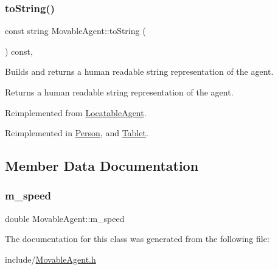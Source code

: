 \subsubsection{\texorpdfstring{to\+String()}{toString()}}
{\footnotesize\ttfamily const string Movable\+Agent\+::to\+String (\begin{DoxyParamCaption}{ }\end{DoxyParamCaption}) const\hspace{0.3cm}{\ttfamily [override]}, {\ttfamily [virtual]}}

Builds and returns a human readable string representation of the agent. \begin{DoxyReturn}{Returns}
a human readable string representation of the agent. 
\end{DoxyReturn}


Reimplemented from \hyperlink{class_locatable_agent_a88674f4c8ab9b1b2f3986b226bf4244f}{Locatable\+Agent}.



Reimplemented in \hyperlink{class_person_a68872538da519d0a04297f43376db27c}{Person}, and \hyperlink{class_tablet_a3fae01e7d526699476221c6a686a4fba}{Tablet}.



\subsection{Member Data Documentation}
\mbox{\label{class_movable_agent_ac725b42e7b968740a59c3e1033d69ac5}} 
\subsubsection{\texorpdfstring{m\+\_\+speed}{m\_speed}}
{\footnotesize\ttfamily double Movable\+Agent\+::m\+\_\+speed\hspace{0.3cm}{\ttfamily [private]}}



The documentation for this class was generated from the following file\+:\begin{DoxyCompactItemize}
\item 
include/\hyperlink{_movable_agent_8h}{Movable\+Agent.\+h}\end{DoxyCompactItemize}
